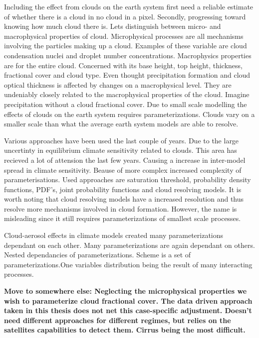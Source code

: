 Including the effect from clouds on the earth system first need a reliable estimate of whether there is a cloud in no cloud in a pixel. Secondly, progressing toward knowing how much cloud there is. Lets distinguish between micro- and macrophysical properties of cloud. Microphysical processes are all mechanisms involving the particles making up a cloud. Examples of these variable are cloud condensation nuclei and droplet number concentrations. Macrophysics properties are for the entire cloud. Concerned with its base height, top height, thickness, fractional cover and cloud type. 
Even thought precipitation formation and cloud optical thickness is affected by changes on a macrophysical level. They are undeniably closely related to the macrophysical properties of the cloud. Imagine precipitation without a cloud fractional cover. Due to small scale modelling the effects of clouds on the earth system requires parameterizations.  Clouds vary on a smaller scale than what the average earth system models are able to resolve. 

Various approaches have been used the last couple of years. Due to the large uncertinty in equilibrium climate sensitivity related to clouds. This area has recieved a lot of attension the last few years. Causing a increase in inter-model spread in climate sensitivity. Beause of more complex increased complexity of parameterisations. Used approaches are saturation threshold, probability density functions, PDF's, joint probability functions and cloud resolving models. It is worth noting that cloud resolving models have a increased resolution and thus resolve more mechanisms involved in cloud formation. However, the name is misleading since it still requires parameterizations of smallest scale processes.

Cloud-aerosol effects in climate models created many parameterizations dependant on each other.
Many parameterizations are again dependant on others. Nested dependancies of parameterizations. Scheme is a set of parameterizations.One variables distribution being the result of many interacting processes.

\textbf{Move to somewhere else: Neglecting the microphysical properties we wish to parameterize cloud fractional cover.
The data driven approach taken in this thesis does not net this case-specific adjustment. Doesn't need different approaches for different regimes, but relies on the satellites capabilities to detect them. Cirrus being the most difficult. }

